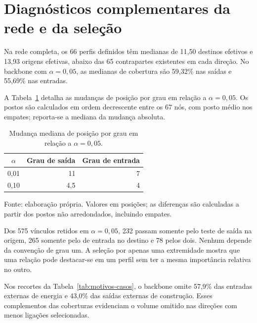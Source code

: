 \section{Diagnósticos complementares da rede e da seleção}
\label{anexo:diagnosticos}

Na rede completa, os 66 perfis definidos têm medianas de 11,50 destinos efetivos e 13,93 origens efetivas, abaixo das 65 contrapartes existentes em cada direção. No backbone com $\alpha=0{,}05$, as medianas de cobertura são 59,32\% nas saídas e 55,69\% nas entradas.

A Tabela~\ref{tab:postos-complementares} detalha as mudanças de posição por grau em relação a $\alpha=0{,}05$. Os postos são calculados em ordem decrescente entre os 67 nós, com posto médio nos empates; reporta-se a mediana da mudança absoluta.

\begin{table}[htbp]
\centering
\caption{Mudança mediana de posição por grau em relação a $\alpha=0{,}05$.}
\label{tab:postos-complementares}
\begin{tabular}{@{}crr@{}}
\toprule
$\alpha$ & Grau de saída & Grau de entrada \\
\midrule
0,01 & 11 & 7 \\
0,10 & 4,5 & 4 \\
\bottomrule
\end{tabular}
\par\smallskip\begin{minipage}{\textwidth}\footnotesize
Fonte: elaboração própria. Valores em posições; as diferenças são calculadas a partir dos postos não arredondados, incluindo empates.
\end{minipage}
\end{table}

Dos 575 vínculos retidos em $\alpha=0{,}05$, 232 passam somente pelo teste de saída na origem, 265 somente pelo de entrada no destino e 78 pelos dois. Nenhum depende da convenção de grau um. A seleção por apenas uma extremidade mostra que uma relação pode destacar-se em um perfil sem ter a mesma importância relativa no outro.

Nos recortes da Tabela~\ref{tab:motivos-casos}, o backbone omite 57,9\% das entradas externas de energia e 43,0\% das saídas externas de construção. Esses complementos das coberturas evidenciam o volume omitido nas direções com menos ligações selecionadas.
